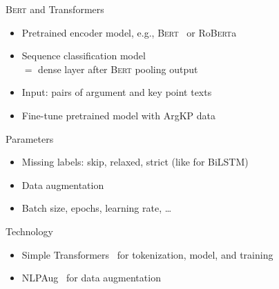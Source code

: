 \documentclass[english,handout]{mlutalk}
\newcommand{\BiLSTM}{\mbox{BiLSTM}\xspace}
\newcommand{\Bert}{\textsc{Bert}\xspace}
\newcommand{\Roberta}{\mbox{Ro\textsc{Bert}a}\xspace}
\begin{document}
\begin{frame}{\Bert and Transformers}

  \begin{itemize}
    \item Pretrained encoder model, e.g., \Bert~\cite{DevlinCLT2018} or \Roberta~\cite{LiuOGDJCLLZS2019}
    \item Sequence classification model \\ \(=\) dense layer after \Bert pooling output
    \item Input: pairs of argument and key point texts
    \item Fine-tune pretrained model with ArgKP data
  \end{itemize}
  
  \begin{block}{Parameters}
    \begin{itemize}
    		\item Missing labels: skip, relaxed, strict (like for \BiLSTM)
    		\item Data augmentation
    		\item Batch size, epochs, learning rate, \ldots
    \end{itemize}
  \end{block}
  
  \begin{block}{Technology}
    \begin{itemize}
      \item Simple Transformers~\cite{Rajapaske2019} for tokenization, model, and training
      \item NLPAug~\cite{Edward2019} for data augmentation
    \end{itemize}
  \end{block}

\end{frame}
\end{document}
